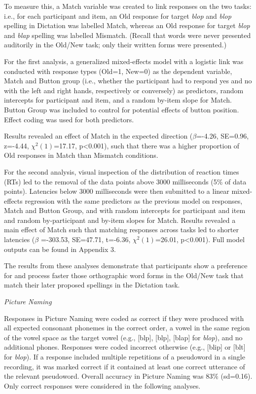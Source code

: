 \documentclass[
  english,
  man,floatsintext]{apa7}
\begin{document}
To measure this, a Match variable was created to link responses on the two tasks: i.e., for each participant and item, an Old response for target \emph{blop} and \emph{blop} spelling in Dictation was labelled Match, whereas an Old response for target \emph{blop} and \emph{blap} spelling was labelled Mismatch. (Recall that words were never presented auditorily in the Old/New task; only their written forms were presented.)

For the first analysis, a generalized mixed-effects model with a logistic link was conducted with response types (Old=1, New=0) as the dependent variable, Match and Button group (i.e., whether the participant had to respond yes and no with the left and right hands, respectively or conversely) as predictors, random intercepts for participant and item, and a random by-item slope for Match. Button Group was included to control for potential effects of button position. Effect coding was used for both predictors.

Results revealed an effect of Match in the expected direction (\(\beta\)=-4.26, SE=0.96, z=-4.44, \(\chi^2(1)\)=17.17, p\textless0.001), such that there was a higher proportion of Old responses in Match than Mismatch conditions.

For the second analysis, visual inspection of the distribution of reaction times (RTs) led to the removal of the data points above 3000 milliseconds (5\% of data points). Latencies below 3000 milliseconds were then submitted to a linear mixed-effects regression with the same predictors as the previous model on responses, Match and Button Group, and with random intercepts for participant and item and random by-participant and by-item slopes for Match. Results revealed a main effect of Match such that matching responses across tasks led to shorter latencies (\(\beta\) =-303.53, SE=47.71, t=-6.36, \(\chi^2(1)\)=26.01, p\textless0.001). Full model outputs can be found in Appendix 3.

The results from these analyses demonstrate that participants show a preference for and process faster those orthographic word forms in the Old/New task that match their later proposed spellings in the Dictation task.

\emph{Picture Naming}

Responses in Picture Naming were coded as correct if they were produced with all expected consonant phonemes in the correct order, a vowel in the same region of the vowel space as the target vowel (e.g., {[}bl\textscripta p{]}, {[}bl\textopeno p{]}, {[}blap{]} for \emph{blop}), and no additional phones. Responses were coded incorrect otherwise (e.g., {[}blip{]} or {[}bl\textscripta t{]} for \emph{blop}). If a response included multiple repetitions of a pseudoword in a single recording, it was marked correct if it contained at least one correct utterance of the relevant pseudoword. Overall accuracy in Picture Naming was 83\% (sd=0.16). Only correct responses were considered in the following analyses.
\end{document}

